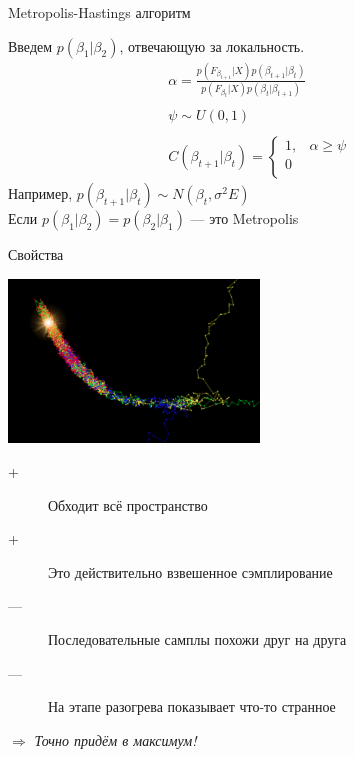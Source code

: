 \documentclass[14pt, fleqn, xcolor={dvipsnames, table}]{beamer}
\begin{document}
\begin{frame}{Metropolis-Hastings алгоритм}

Введем $p(\beta_1|\beta_2)$, отвечающую за локальность.
$$\begin{array}{l}
\alpha = \frac{p(F_{\beta_{t+1}}|X)p(\beta_{t+1}|\beta_t)}{p(F_{\beta_t}|X)p(\beta_t|\beta_{t+1})}\\
\\
\psi \sim U(0,1)\\
\\
C(\beta_{t+1}|\beta_t) = \left\{  
           \begin{array}{ll}  
            1,& \alpha \ge \psi \\  
            0 &\\  
           \end{array}   
           \right.  
\end{array}$$
Например, $p(\beta_{t+1}|\beta_t) \sim N(\beta_t,\sigma^2E)$ \\
Если $p(\beta_1 | \beta_2) = p(\beta_2 | \beta_1)$ --- это Metropolis \\ 
\end{frame}

\begin{frame}{Свойства}
\begin{center}
\includegraphics[width=0.5\textwidth]{mcmc.png}
\end{center}
\footnotesize
\begin{description}
  \item[\color{green}+] Обходит всё пространство
  \item[\color{green}+] Это действительно взвешенное сэмплирование
  \item[\color{red}---] Последовательные самплы похожи друг на друга
  \item[\color{red}---] На этапе разогрева показывает что-то странное
\end{description}
$\Rightarrow$ \textit{Точно придём в максимум!} \\
\end{frame}
\end{document}
